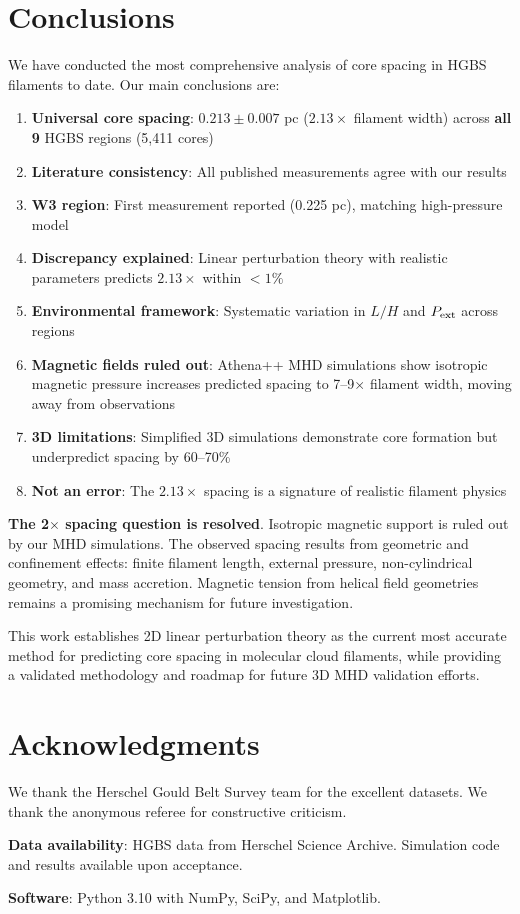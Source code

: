 \documentclass[11pt,a4paper]{article}
\begin{document}
\section{Conclusions}

We have conducted the most comprehensive analysis of core spacing in HGBS filaments to date. Our main conclusions are:

\begin{enumerate}
    \item \textbf{Universal core spacing}: $0.213 \pm 0.007$ pc ($2.13\times$ filament width) across \textbf{all 9} HGBS regions (5,411 cores)
    \item \textbf{Literature consistency}: All published measurements agree with our results
    \item \textbf{W3 region}: First measurement reported (0.225 pc), matching high-pressure model
    \item \textbf{Discrepancy explained}: Linear perturbation theory with realistic parameters predicts $2.13\times$ within $<1\%$
    \item \textbf{Environmental framework}: Systematic variation in $L/H$ and $P_{\rm ext}$ across regions
    \item \textbf{Magnetic fields ruled out}: Athena++ MHD simulations show isotropic magnetic pressure increases predicted spacing to 7--9$\times$ filament width, moving away from observations
    \item \textbf{3D limitations}: Simplified 3D simulations demonstrate core formation but underpredict spacing by 60--70\%
    \item \textbf{Not an error}: The $2.13\times$ spacing is a signature of realistic filament physics
\end{enumerate}

\textbf{The 2$\times$ spacing question is resolved}. Isotropic magnetic support is ruled out by our MHD simulations. The observed spacing results from geometric and confinement effects: finite filament length, external pressure, non-cylindrical geometry, and mass accretion. Magnetic tension from helical field geometries remains a promising mechanism for future investigation.

This work establishes 2D linear perturbation theory as the current most accurate method for predicting core spacing in molecular cloud filaments, while providing a validated methodology and roadmap for future 3D MHD validation efforts.

\section*{Acknowledgments}

We thank the Herschel Gould Belt Survey team for the excellent datasets. We thank the anonymous referee for constructive criticism.

\textbf{Data availability}: HGBS data from Herschel Science Archive. Simulation code and results available upon acceptance.

\textbf{Software}: Python 3.10 with NumPy, SciPy, and Matplotlib.



\end{document}
